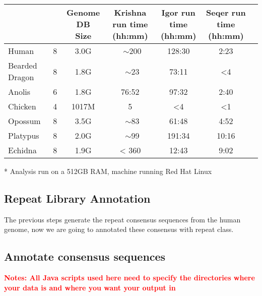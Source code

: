 \documentclass[12pt]{report}
\begin{document}
\footnotesize  %
\setlength\tabcolsep{1.5pt}
\begin{center}
	\begin{tabular}{|l|c|c|c|c|c|c|}
		\hline
		\thead{Genome}	&	\thead{ Krishna Threads }	&	\thead{Genome DB \\ Size}	& \thead{Krishna run time \\ (hh:mm)}	&	\thead{Igor run time \\ (hh:mm)}	&	\thead{Seqer run time \\ (hh:mm)}  \\
		\hline
		Human	&	8	&	3.0G	&	~$\sim$200	&	128:30	&	2:23 \\
		\hline 
		Bearded Dragon	&	8	&	1.8G	&	~$\sim$23	&	73:11	&	{<}4 \\
		\hline
		Anolis	& 6	& 1.8G	& 76:52	&	97:32	& 2:40	\\
		\hline
		Chicken	&	4	&	1017M	&	5	&	{<}4 & {<}1 \\
		\hline
		Opossum	&	8	&	3.5G	&	~$\sim$83	&	61:48	&	4:52 \\
		\hline
		Platypus	&	8	&	2.0G	&	~$\sim$99	&	191:34	&	10:16 \\
		\hline
		Echidna	&	8	&	1.9G	&	{<} 360	&	12:43	&	9:02 \\
		\hline
	\end{tabular}
\end{center}

* Analysis run on a 512GB RAM, machine running Red Hat Linux




\subsection*{Repeat Library Annotation}
The previous steps generate the repeat consensus sequences from the human genome, now we are going to annotated these consensus with repeat class.
\subsection*{Annotate consensus sequences}
\textbf{\textcolor{red}{Notes: All Java scripts used here need to specify the directories where your data is and where you want your output in }}
\end{document}
